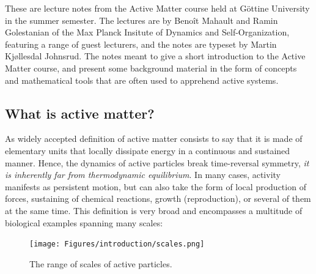\label{chapter: introduction}

These are lecture notes from the Active Matter course held at Göttine University in the summer semester.
The lectures are by Benoît Mahault and Ramin Golestanian of the Max Planck Insitute of Dynamics and Self-Organization, featuring a range of guest lecturers, and the notes are typeset by Martin Kjøllesdal Johnsrud.
The notes meant to give a short introduction to the Active Matter course, and present some background material in the form of concepts and mathematical tools that are often used to apprehend active systems.



\subsection{What is active matter?}


As widely accepted definition of active matter consists to say that it is made of elementary units that locally dissipate energy in a continuous and sustained manner. Hence, the dynamics of active particles break time-reversal symmetry, \textit{it is inherently far from thermodynamic equilibrium}. In many cases, activity manifests as persistent motion, but can also take the form of local production of forces, sustaining of chemical reactions, growth (reproduction), or several of them at the same time. This definition is very broad and encompasses a multitude of biological examples spanning many scales:

\begin{figure}[!htb]
    \centering
    \texttt{[image: Figures/introduction/scales.png]}
    \caption{The range of scales of active particles.}
    \label{fig: scales active particles}
\end{figure}



